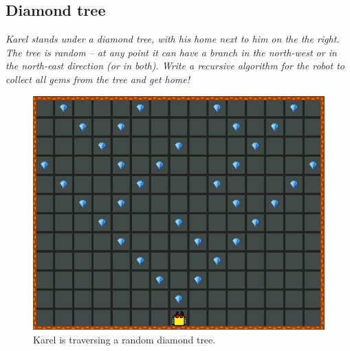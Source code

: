\subsection{Diamond tree}

{\em Karel stands under a diamond tree, with his home next to him on the the right. 
The tree is random -- at any point it can have 
a branch in the north-west or in the north-east direction (or in both). Write a recursive 
algorithm for the robot to collect all gems from the tree and get home!  }

\begin{figure}[!ht]
\begin{center}
\includegraphics[height=0.4\textwidth]{img/g04.png}
\end{center}
\vspace{-4mm}
\caption{Karel is traversing a random diamond tree.}
\label{fig:g04}
\vspace{-10mm}
\end{figure}
